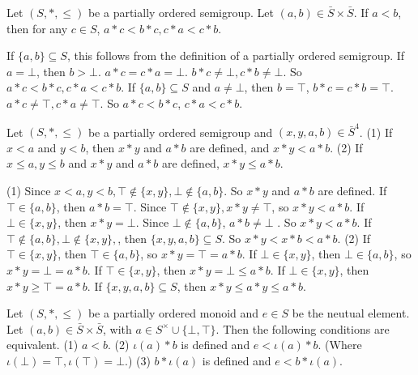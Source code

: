 \begin{propositionenv}
    Let $(S,*,\le)$ be a partially ordered semigroup. Let $(a,b)\in \bar{S}\times \bar{S}$. If $a<b$, then for any $c\in S$, $a*c<b*c,c*a<c*b$.
\end{propositionenv}
\begin{proofenv}
    If $\{a,b\}\subseteq S$, this follows from the definition of a partially ordered semigroup. If $a=\bot$, then $b>\bot$. $a*c=c*a=\bot$. $b*c\not=\bot, c*b\not=\bot$. So $a*c<b*c,c*a<c*b$. If $\{a,b\}\subseteq S$ and $a\not=\bot$, then $b=\top$, $b*c=c*b=\top$. $a*c\not=\top,c*a\not=\top$. So $a*c<b*c$, $c*a<c*b$.
\end{proofenv}
\begin{propositionenv}
    \quad \newline
    Let $(S,*,\le)$  be a partially ordered semigroup and $(x,y,a,b)\in \bar{S}^4$. 
    \newline
    (1) If $x<a$ and $y<b$, then $x*y$ and $a*b$ are defined, and $x*y<a*b$.
    \newline
    (2) If $x\le a, y\le b$ and $x*y$  and $a*b$ are defined, $x*y\le a*b$.
\end{propositionenv}
\begin{proofenv}
    \quad\newline
    (1) Since $x<a,y<b, \top\notin\{x,y\},\bot\notin\{a,b\}$. So $x*y$ and $a*b$ are defined.
    If $\top\in \{a,b\}$, then $a*b=\top$. Since $\top\notin\{x,y\},x*y\not=\top$, so $x*y<a*b$.
    If $\bot\in\{x,y\}$, then $x*y=\bot$. Since $\bot\notin\{a,b\}$, $a*b\not=\bot$ . So $x*y<a*b$.
    If $\top\notin\{a,b\},\bot\notin\{x,y\},$, then $\{x,y,a,b\}\subseteq S$. So $x*y<x*b<a*b$.
    \newline
    (2) If $\top\in\{x,y\}$, then $\top\in \{a,b\}$, so $x*y=\top=a*b$.
    If $\bot\in\{x,y\}$, then $\bot\in\{a,b\}$, so $x*y=\bot=a*b$.
    If $\top\in \{x,y\}$, then $x*y=\bot\le a*b$.
    If $\bot\in\{x,y\}$, then $x*y\ge \top= a*b$.
    If $\{x,y,a,b\}\subseteq S$, then $x*y\le a*y \le a*b$.
\end{proofenv}
\begin{propositionenv}
    Let $(S,*,\le)$ be a partially ordered monoid and $e\in S$ be the neutual element. Let $(a,b)\in \bar{S}\times\bar{S}$, with $a\in S^\times\cup\{\bot,\top\}$. Then the following conditions are equivalent.
    \newline
    (1) $a<b$.
    \newline
    (2) $\iota(a)*b$ is defined and $e<\iota(a)*b$. (Where $\iota(\bot)=\top, \iota(\top)=\bot$.)
    \newline
    (3) $b*\iota(a)$ is defined and $e<b*\iota(a)$.
\end{propositionenv}
